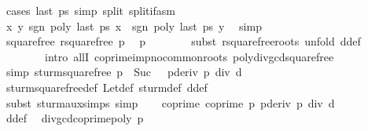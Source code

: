 \begin{isabellebody}
\ {\isacharparenleft}cases\ {\isachardoublequoteopen}last\ {\isacharquery}ps{\isacharprime}{\isachardoublequoteclose}{\isacharcomma}\ simp\ split{\isacharcolon}\ split{\isacharunderscore}if{\isacharunderscore}asm{\isacharparenright}\isanewline
\ \ \ \ \isamarkupfalse%
\ {\isachardoublequoteopen}{\isasymAnd}x\ y{\isachardot}\ sgn\ {\isacharparenleft}poly\ {\isacharparenleft}last\ {\isacharquery}ps{\isacharprime}{\isacharparenright}\ x{\isacharparenright}\ {\isacharequal}\ sgn\ {\isacharparenleft}poly\ {\isacharparenleft}last\ {\isacharquery}ps{\isacharprime}{\isacharparenright}\ y{\isacharparenright}{\isachardoublequoteclose}\ \isamarkupfalse%
\ simp\isanewline
\ \ \isacommand{{\isacharbraceright}}\isamarkupfalse%
\isanewline
\isanewline
\ \ \isamarkupfalse%
\ squarefree{\isacharcolon}\ {\isachardoublequoteopen}rsquarefree\ {\isacharquery}p{\isacharprime}{\isachardoublequoteclose}\ \isamarkupfalse%
\ {\isacharbackquoteopen}p\ {\isasymnoteq}\ {}{\isacharbackquoteclose}\isanewline
\ \ \ \ \isamarkupfalse%
\ {\isacharparenleft}subst\ rsquarefree{\isacharunderscore}roots{\isacharcomma}\ unfold\ d{\isacharunderscore}def{\isacharcomma}\ \isanewline
\ \ \ \ \ \ \ \ intro\ allI\ coprime{\isacharunderscore}imp{\isacharunderscore}no{\isacharunderscore}common{\isacharunderscore}roots\ poly{\isacharunderscore}div{\isacharunderscore}gcd{\isacharunderscore}squarefree{\isacharparenright}\isanewline
\ \ \isamarkupfalse%
\ {\isacharbrackleft}simp{\isacharbrackright}{\isacharcolon}\ {\isachardoublequoteopen}sturm{\isacharunderscore}squarefree{\isacharprime}\ p\ {\isacharbang}\ Suc\ {}\ {\isacharequal}\ pderiv\ p\ div\ d{\isachardoublequoteclose}\isanewline
\ \ \ \ \ \ \isamarkupfalse%
\ sturm{\isacharunderscore}squarefree{\isacharprime}{\isacharunderscore}def\ Let{\isacharunderscore}def\ sturm{\isacharunderscore}def\ d{\isacharunderscore}def\isanewline
\ \ \ \ \ \ \ \ \ \ \isamarkupfalse%
\ {\isacharparenleft}subst\ sturm{\isacharunderscore}aux{\isachardot}simps{\isacharcomma}\ simp{\isacharparenright}\isanewline
\ \ \isamarkupfalse%
\ coprime{\isacharcolon}\ {\isachardoublequoteopen}coprime\ {\isacharquery}p{\isacharprime}\ {\isacharparenleft}pderiv\ p\ div\ d{\isacharparenright}{\isachardoublequoteclose}\ \isanewline
\ \ \ \ \ \ \isamarkupfalse%
\ d{\isacharunderscore}def\ \isamarkupfalse%
\ div{\isacharunderscore}gcd{\isacharunderscore}coprime{\isacharunderscore}poly\ {\isacharbackquoteopen}p\ {\isasymnoteq}\ {}{\isacharbackquoteclose}\ \isamarkupfalse%

\end{isabellebody}

